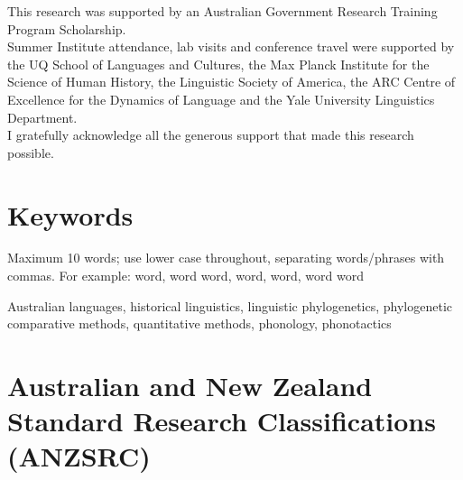 
This research was supported by an Australian Government Research Training Program Scholarship.\\

\noindent
Summer Institute attendance, lab visits and conference travel were supported by the UQ School of Languages and Cultures, the Max Planck Institute for the Science of Human History, the Linguistic Society of America, the ARC Centre of Excellence for the Dynamics of Language and the Yale University Linguistics Department.\\

\noindent
I gratefully acknowledge all the generous support that made this research possible.



\section*{Keywords}

\begin{instructional}
	Maximum 10 words; use lower case throughout, separating words/phrases with commas. For example: word, word word, word, word, word word
\end{instructional}

Australian languages, historical linguistics, linguistic phylogenetics, phylogenetic comparative methods, quantitative methods, phonology, phonotactics



\section*{Australian and New Zealand Standard Research Classifications (ANZSRC)}

